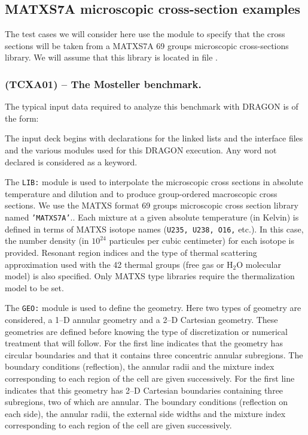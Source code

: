 \subsection{MATXS7A microscopic cross-section examples}\label{sect:ExMATXS}

The test cases we will consider here use the  module to specify that
the cross sections will be taken from a MATXS7A 69 groups microscopic
cross-sections library. We will assume that this library is located in file
.

\subsubsection{\tst(TCXA01) -- The Mosteller benchmark.} 
              
The typical input data required to analyze this
benchmark\cite{Mostel} with DRAGON is of the form:


\vskip 0.3cm

The input deck begins with declarations for the linked lists and the interface
files and the various modules used for this DRAGON execution. Any word not declared is considered as
a keyword.

The {\tt LIB:} module is used to interpolate the microscopic cross sections
in absolute temperature and dilution and to produce group-ordered macroscopic
cross sections. We use the MATXS format 69 groups microscopic cross
section library named {\tt 'MATXS7A'}.\cite{MATXS7A}.
Each mixture at a given absolute temperature (in Kelvin) is defined in terms
of MATXS isotope names ({\tt U235, U238, O16,} etc.). In this case, the
number density (in $10^{24}$ particules per cubic centimeter) for each isotope is
provided. Resonant region indices and the type of thermal scattering
approximation used with the 42 thermal groups (free gas or H$_2$O molecular
model) is also specified. Only MATXS type libraries require the thermalization
model to be set.


The {\tt GEO:} module is used to define the geometry. Here two types of geometry are considered,
 a 1--D annular geometry and  a 2--D Cartesian geometry. These geometries
are defined before knowing the type of discretization or numerical treatment that will follow.
For  the first line indicates that the geometry has circular boundaries and that it
contains three concentric annular subregions. The boundary conditions (reflection), the annular
radii and the mixture index corresponding to each region of the cell are
given successively. For  the first line indicates that this geometry has 2--D
Cartesian boundaries containing three subregions, two of which are annular. The boundary conditions
(reflection on each side), the annular radii, the external side widths and the mixture index
corresponding to each region of the cell are given successively.

